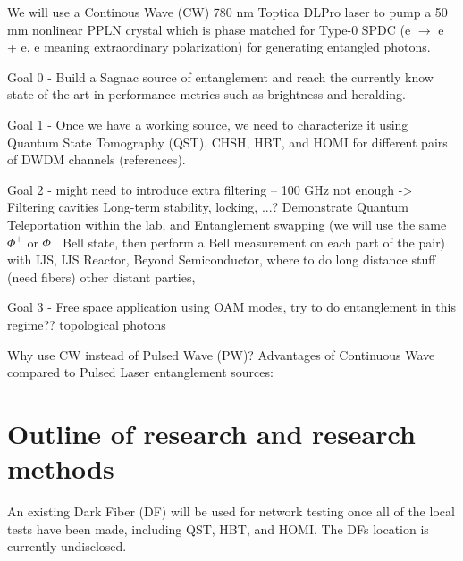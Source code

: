 \documentclass{article}
\theoremstyle{mytheoremstyle}
\theoremstyle{mytheoremstyle}
\theoremstyle{myproblemstyle}
\begin{document}
We will use a Continous Wave (CW) 780 nm Toptica DLPro laser to pump a 50 mm nonlinear PPLN crystal which is phase matched for Type-0 SPDC (e $\rightarrow$ e + e, e meaning extraordinary polarization)
for generating entangled photons.

Goal 0 - Build a Sagnac source of entanglement and reach the currently know state of the art in performance metrics such as brightness and heralding.

Goal 1 - Once we have a working source, we need to characterize it using Quantum State Tomography (QST), CHSH, HBT, and HOMI for different pairs of DWDM channels (references).

Goal 2 - might need to introduce extra filtering -- 100 GHz not enough -> Filtering cavities
Long-term stability, locking, ...? Demonstrate Quantum Teleportation within the lab, and Entanglement swapping (we will use the same $\Phi^+$ or $\Phi^-$ Bell state,
then perform a Bell measurement on each part of the pair) with IJS, IJS Reactor, Beyond Semiconductor, where to do
long distance stuff (need fibers) other distant parties,

Goal 3 - Free space application using OAM modes, try to do entanglement in this regime??
topological photons

Why use CW instead of Pulsed Wave (PW)?
Advantages of Continuous Wave compared to Pulsed Laser entanglement sources:

\section{Outline of research and research methods}
An existing Dark Fiber (DF) will be used for network testing once all of the local tests have been made, including QST, HBT, and HOMI. 
The DFs location is currently undisclosed.
\end{document}
